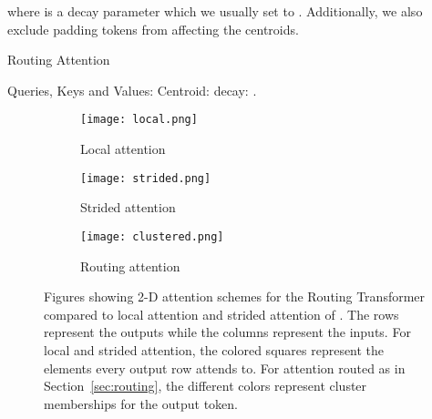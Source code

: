 \documentclass[a4paper]{article}
\begin{document}
where  is a decay parameter which we usually set to .
Additionally, we also exclude padding tokens from affecting the centroids.

\begin{algorithm}
\caption{Routing Attention}\label{alg:routing}
\begin{algorithmic}[1]
\State Queries, Keys and Values: 
\State Centroid: 
\State decay: 
\State 
\EndIf
{}
\State  {}
\State  {}
\State  \Comment{}
\State  \Comment{}
\EndIf
\State  {}
\State  \Comment{}
\State  {}
\State  \Comment{}
\State  \Comment{}
\State  {}
\EndIf
\State  \Comment{}
\State  \Comment{}
\State  \Comment{}
\State  \Comment{}
\State 
\EndIf
\State . \Comment{}
\State 
\State  
\State  \Comment{}
\State  \Comment{}
\State 
\State \Return{}
\end{algorithmic}
\end{algorithm}
\begin{figure*}[h]
\begin{subfigure}{.33\textwidth}
  \centering
  \texttt{[image: local.png]}
  \caption{Local attention}
  \label{fig:sfig1}
\end{subfigure}\begin{subfigure}{.33\textwidth}
  \centering
  \texttt{[image: strided.png]}
  \caption{Strided attention}
  \label{fig:sfig2}
\end{subfigure}
\begin{subfigure}{.33\textwidth}
  \centering
  \texttt{[image: clustered.png]}
  \caption{Routing attention}
  \label{fig:sfig3}
\end{subfigure}
\caption{Figures showing 2-D attention schemes for the Routing Transformer compared to local attention and
strided attention of \cite{child2019generating}. The rows represent the outputs while the columns represent
the inputs. For local and strided attention, the colored squares represent the elements every output row
attends to. For attention routed as in Section~\ref{sec:routing}, the different colors represent cluster memberships
for the output token.}
\label{fig:attention}
\end{figure*}
\end{document}
